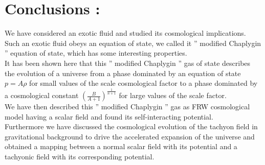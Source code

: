 \documentclass[a4paper,12pt,a4]{article}
\begin{document}
\section{Conclusions : }
We have considered an exotic fluid and studied its cosmological 
implications. Such an exotic fluid obeys an equation of state,
we called it '' modified Chaplygin '' equation of state, which has some 
interesting properties. \\ 
It has been shown here that this '' modified Chaplygin '' 
gas of state describes the evolution of a universe from a phase dominated 
by an equation of state $p = A \rho$ for small values of the scale 
cosmological factor to a phase dominated by a cosmological 
constant $\left( \frac{B}{A+1} \right)^{\frac{1}{n+1}}$ for large values 
of the scale factor. \\
We have then described this '' modified Chaplygin '' gas as FRW 
cosmological model having a scalar field and found its self-interacting 
potential. \\ 
Furthermore we have discussed the cosmological evolution of the tachyon field 
in gravitational background to drive the accelerated expansion of the 
universe and obtained a mapping between a normal scalar field with its 
potential and a tachyonic field with its corresponding potential.  
\end{document}
